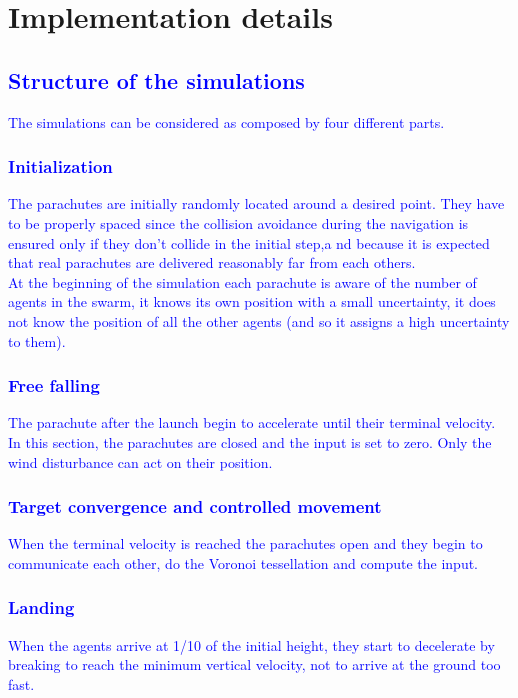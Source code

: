 \section{Implementation details}\label{sec:implementation_details}

\textcolor{blue}{\subsection{Structure of the simulations}
The simulations can be considered as composed by four different parts.
\subsubsection{Initialization}
The parachutes are initially randomly located around a desired point. They have to be properly spaced since the collision avoidance during the navigation is ensured only if they don't collide in the initial step,a nd because it is expected that real parachutes are delivered reasonably far from each others. \\
At the beginning of the simulation each parachute is aware of the number of agents in the swarm, it knows its own position with a small uncertainty, it does not know the position of all the other agents (and so it assigns a high uncertainty to them).
\subsubsection{Free falling}
The parachute after the launch begin to accelerate until their terminal velocity. In this section, the parachutes are closed and the input is set to zero. Only the wind disturbance can act on their position.
\subsubsection{Target convergence and controlled movement}
When the terminal velocity is reached the parachutes open and they begin to communicate each other, do the Voronoi tessellation and compute the input.
\subsubsection{Landing}
When the agents arrive at 1/10 of the initial height, they start to decelerate by breaking to reach the minimum vertical velocity, not to arrive at the ground too fast.}

